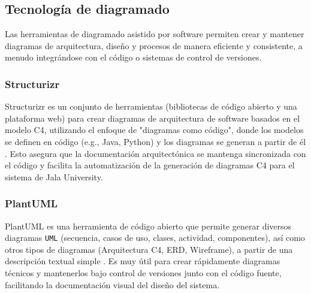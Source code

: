 \subsection{Tecnología de diagramado}
Las herramientas de diagramado asistido por software permiten crear y mantener diagramas de arquitectura, diseño y procesos de manera eficiente y consistente, a menudo integrándose con el código o sistemas de control de versiones.

\subsubsection{Structurizr}
Structurizr es un conjunto de herramientas (bibliotecas de código abierto y una plataforma web) para crear diagramas de arquitectura de software basados en el modelo C4, utilizando el enfoque de "diagramas como código", donde los modelos se definen en código (e.g., Java, Python) y los diagramas se generan a partir de él \parencite{BrownStructurizr}.
Esto asegura que la documentación arquitectónica se mantenga sincronizada con el código y facilita la automatización de la generación de diagramas C4 para el sistema de Jala University.

\subsubsection{PlantUML}
PlantUML es una herramienta de código abierto que permite generar diversos diagramas \texttt{UML} (secuencia, casos de uso, clases, actividad, componentes), así como otros tipos de diagramas (Arquitectura C4, ERD, Wireframe), a partir de una descripción textual simple \parencite{PlantUML}.
Es muy útil para crear rápidamente diagramas técnicos y mantenerlos bajo control de versiones junto con el código fuente, facilitando la documentación visual del diseño del sistema.

